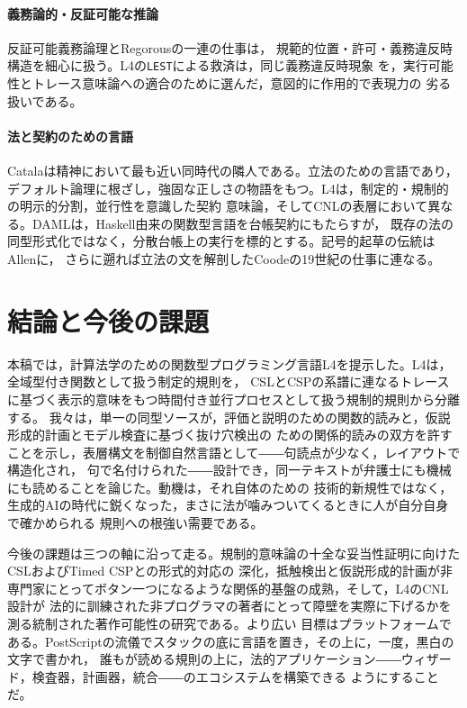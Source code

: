 \documentclass[11pt,a4paper]{ltjsarticle}
\newcommand{\code}[1]{\texttt{\small #1}}
\begin{document}
\paragraph{義務論的・反証可能な推論}
反証可能義務論理とRegorousの一連の仕事\cite{governatori2005regorous,governatori2016semantics}は，
規範的位置・許可・義務違反時構造を細心に扱う。L4の\code{LEST}による救済は，同じ義務違反時現象
\cite{chisholm1963ctd}を，実行可能性とトレース意味論への適合のために選んだ，意図的に作用的で表現力の
劣る扱いである。

\paragraph{法と契約のための言語}
Catala\cite{merigoux2021catala}は精神において最も近い同時代の隣人である。立法のための言語であり，
デフォルト論理に根ざし，強固な正しさの物語をもつ。L4は，制定的・規制的の明示的分割，並行性を意識した契約
意味論，そしてCNLの表層において異なる。DAML\cite{daml}は，Haskell由来の関数型言語を台帳契約にもたらすが，
既存の法の同型形式化ではなく，分散台帳上の実行を標的とする。記号的起草の伝統はAllen\cite{allen1957symbolic}に，
さらに遡れば立法の文を解剖したCoodeの19世紀の仕事\cite{coode1843}に連なる。

\section{結論と今後の課題}\label{sec:conclusion}
本稿では，計算法学のための関数型プログラミング言語L4を提示した。L4は，全域型付き関数として扱う制定的規則を，
CSLとCSPの系譜に連なるトレースに基づく表示的意味をもつ時間付き並行プロセスとして扱う規制的規則から分離する。
我々は，単一の同型ソースが，評価と説明のための関数的読みと，仮説形成的計画とモデル検査に基づく抜け穴検出の
ための関係的読みの双方を許すことを示し，表層構文を制御自然言語として――句読点が少なく，レイアウトで構造化され，
句で名付けられた――設計でき，同一テキストが弁護士にも機械にも読めることを論じた。動機は，それ自体のための
技術的新規性ではなく，生成的AIの時代に鋭くなった，まさに法が噛みついてくるときに人が自分自身で確かめられる
規則への根強い需要である。

今後の課題は三つの軸に沿って走る。規制的意味論の十全な妥当性証明に向けたCSLおよびTimed CSPとの形式的対応の
深化，抵触検出と仮説形成的計画が非専門家にとってボタン一つになるような関係的基盤の成熟，そして，L4のCNL設計が
法的に訓練された非プログラマの著者にとって障壁を実際に下げるかを測る統制された著作可能性の研究である。より広い
目標はプラットフォームである。PostScriptの流儀でスタックの底に言語を置き，その上に，一度，黒白の文字で書かれ，
誰もが読める規則の上に，法的アプリケーション――ウィザード，検査器，計画器，統合――のエコシステムを構築できる
ようにすることだ。
\end{document}
